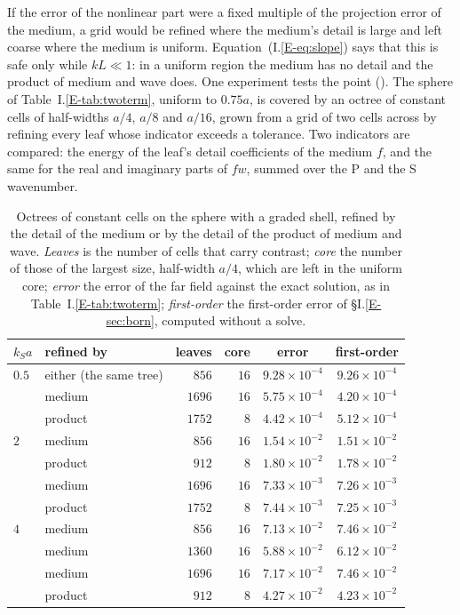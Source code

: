 \documentclass[11pt,a4paper]{article}
\begin{document}
If the error of the nonlinear part were a
fixed multiple of the projection error of the medium, a grid would be refined where the medium's detail
is large and left coarse where the medium is uniform. Equation~(I.\ref{E-eq:slope}) says that this is safe
only while $kL\ll1$: in a uniform region the medium has no detail and the product of medium and wave
does. One experiment tests the point (). The sphere of
Table~I.\ref{E-tab:twoterm}, uniform to $0.75a$, is covered by an octree of constant cells of half-widths
$a/4$, $a/8$ and $a/16$, grown from a grid of two cells across by refining every leaf whose indicator
exceeds a tolerance. Two indicators are compared: the energy of the leaf's detail coefficients of the
medium $f$, and the same for the real and imaginary parts of $fw$, summed over the P and the S wavenumber.
\begin{table}[htbp]
\centering
\caption{Octrees of constant cells on the sphere with a graded shell, refined by the detail of the medium
or by the detail of the product of medium and wave. \emph{Leaves} is the number of cells that carry
contrast; \emph{core} the number of those of the largest size, half-width $a/4$, which are left in the
uniform core; \emph{error} the error of the far field against the exact solution, as in
Table~I.\ref{E-tab:twoterm}; \emph{first-order} the first-order error of \S I.\ref{E-sec:born}, computed without
a solve.}\label{tab:trees}
\small
\begin{tabular}{@{}llrrcc@{}}
\toprule
$k_Sa$ & refined by & leaves & core & error & first-order \\
\midrule
$0.5$ & either (the same tree) & $856$ & $16$ & $9.28\times10^{-4}$ & $9.26\times10^{-4}$ \\
      & medium  & $1696$ & $16$ & $5.75\times10^{-4}$ & $4.20\times10^{-4}$ \\
      & product & $1752$ & $8$  & $4.42\times10^{-4}$ & $5.12\times10^{-4}$ \\
\midrule
$2$ & medium  & $856$  & $16$ & $1.54\times10^{-2}$ & $1.51\times10^{-2}$ \\
    & product & $912$  & $8$  & $1.80\times10^{-2}$ & $1.78\times10^{-2}$ \\
    & medium  & $1696$ & $16$ & $7.33\times10^{-3}$ & $7.26\times10^{-3}$ \\
    & product & $1752$ & $8$  & $7.44\times10^{-3}$ & $7.25\times10^{-3}$ \\
\midrule
$4$ & medium  & $856$  & $16$ & $7.13\times10^{-2}$ & $7.46\times10^{-2}$ \\
    & medium  & $1360$ & $16$ & $5.88\times10^{-2}$ & $6.12\times10^{-2}$ \\
    & medium  & $1696$ & $16$ & $7.17\times10^{-2}$ & $7.46\times10^{-2}$ \\
    & product & $912$  & $8$  & $4.27\times10^{-2}$ & $4.23\times10^{-2}$ \\
\bottomrule
\end{tabular}
\end{table}
\end{document}
